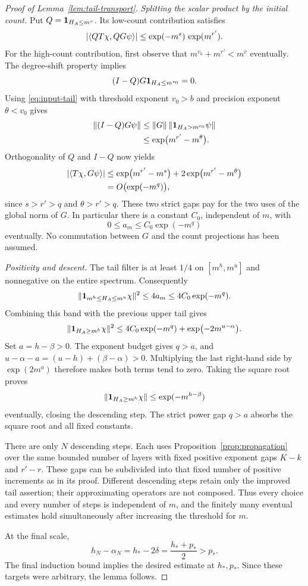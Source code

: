 \begin{proof}[Proof of Lemma~\ref{lem:tail-transport}]
\emph{Splitting the scalar product by the initial count.}
Put $Q=\mathbf 1_{H_A\le m^v}$.  Its low-count contribution satisfies
\[
 \lvert\langle QT\chi,QG\psi\rangle\rvert
 \le\exp(-m^s)\,\exp(m^{r'}).
\]
For the high-count contribution, first observe that
$m^{v_0}+m^{r'}<m^v$ eventually.  The degree-shift property implies
\[
 (I-Q)G\mathbf 1_{H_A\le m^{v_0}}=0.
\]
Using \eqref{eq:input-tail} with threshold exponent $v_0>b$
and precision exponent $\theta<v_0$ gives
\begin{align*}
 \lVert(I-Q)G\psi\rVert
 &\le\lVert G\rVert\,\lVert\mathbf 1_{H_A>m^{v_0}}\psi\rVert\\
 &\le\exp\bigl(m^{r'}-m^\theta\bigr).
\end{align*}
Orthogonality of $Q$ and $I-Q$ now yields
\begin{align*}
 \lvert\langle T\chi,G\psi\rangle\rvert
 &\le\exp\bigl(m^{r'}-m^s\bigr)
      +2\exp\bigl(m^{r'}-m^\theta\bigr)\\
 &=O\bigl(\exp(-m^q)\bigr),
\end{align*}
since $s>r'>q$ and $\theta>r'>q$.  These two strict gaps pay for
the two uses of the global norm of $G$.  In particular there is a
constant $C_0$, independent of $m$, with
\[
 0\le a_m\le C_0\exp(-m^q)
\]
eventually.  No commutation between $G$ and the count projections has
been assumed.

\emph{Positivity and descent.}
The tail filter is at least $1/4$ on $[m^h,m^u]$ and nonnegative
on the entire spectrum.  Consequently
\[
 \lVert\mathbf 1_{m^h\le H_A\le m^u}\chi\rVert^2
 \le4a_m\le4C_0\exp(-m^q).
\]
Combining this band with the previous upper tail gives
\[
 \lVert\mathbf 1_{H_A\ge m^h}\chi\rVert^2
 \le4C_0\exp(-m^q)
       +\exp\bigl(-2m^{u-\alpha}\bigr).
\]
Set $a=h-\beta>0$.  The exponent budget gives $q>a$, and
$u-\alpha-a=(u-h)+(\beta-\alpha)>0$.  Multiplying the last
right-hand side by $\exp(2m^a)$ therefore makes both terms tend to
zero.  Taking the square root proves
\[
 \lVert\mathbf 1_{H_A\ge m^h}\chi\rVert\le\exp(-m^{h-\beta})
\]
eventually, closing the descending step.  The strict power gap $q>a$
absorbs the square root and all fixed constants.

There are only $N$ descending steps.  Each uses
Proposition~\ref{prop:propagation} over the same bounded number of
layers with fixed positive exponent gaps $K-k$ and $r'-r$.
These gaps can be subdivided into that fixed number of positive
increments as in its proof.  Different descending steps retain only
the improved tail assertion; their approximating operators are not
composed.  Thus every choice and every number of steps is independent
of $m$, and the finitely many eventual estimates hold simultaneously
after increasing the threshold for $m$.

At the final scale,
\[
 h_N-\alpha_N=h_*-2\delta
 =\frac{h_*+p_*}{2}>p_*.
\]
The final induction bound implies the desired estimate at $h_*,p_*$.
Since these targets were arbitrary, the lemma follows.
\end{proof}
